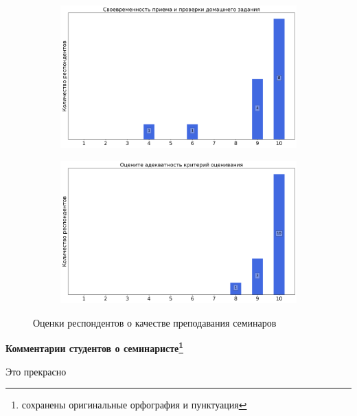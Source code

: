 \begin{figure}[H]
\begin{subfigure}[b]{0.45\textwidth}
            \end{subfigure}
            \begin{subfigure}[b]{0.45\textwidth}
                \centering
                \includegraphics[width=\textwidth]{images/1 course/Аналитическая геометрия/seminarists-marks-Чубаров И.А.-2.png}
            \end{subfigure}
            \begin{subfigure}[b]{0.45\textwidth}
                \centering
                \includegraphics[width=\textwidth]{images/1 course/Аналитическая геометрия/seminarists-marks-Чубаров И.А.-3.png}
            \end{subfigure}	
            \caption{Оценки респондентов о качестве преподавания семинаров}
        \end{figure}

        \textbf{Комментарии студентов о семинаристе\protect\footnote{сохранены оригинальные орфография и пунктуация}}
            \begin{commentbox} 
                Это прекрасно  
            \end{commentbox} 
        
